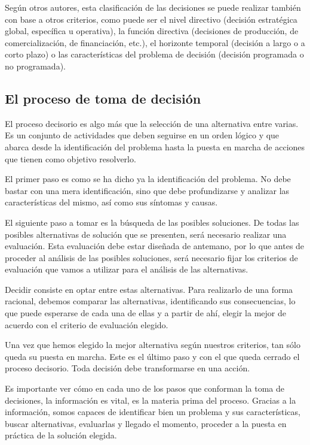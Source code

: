 \documentclass[
]{krantz}
\begin{document}
Según otros autores, esta clasificación de las decisiones se puede realizar también con base a otros criterios, como puede ser el nivel directivo (decisión estratégica global, específica u operativa), la función directiva (decisiones de producción, de comercialización, de financiación, etc.), el horizonte temporal (decisión a largo o a corto plazo) o las características del problema de decisión (decisión programada o no programada).

\hypertarget{el-proceso-de-toma-de-decisiuxf3n}{%
\subsection{El proceso de toma de decisión}\label{el-proceso-de-toma-de-decisiuxf3n}}

El proceso decisorio es algo más que la selección de una alternativa entre varias. Es un conjunto de actividades que deben seguirse en un orden lógico y que abarca desde la identificación del problema hasta la puesta en marcha de acciones que tienen como objetivo resolverlo.

El primer paso es como se ha dicho ya la identificación del problema. No debe bastar con una mera identificación, sino que debe profundizarse y analizar las características del mismo, así como sus síntomas y causas.

El siguiente paso a tomar es la búsqueda de las posibles soluciones. De todas las posibles alternativas de solución que se presenten, será necesario realizar una evaluación. Esta evaluación debe estar diseñada de antemano, por lo que antes de proceder al análisis de las posibles soluciones, será necesario fijar los criterios de evaluación que vamos a utilizar para el análisis de las alternativas.

Decidir consiste en optar entre estas alternativas. Para realizarlo de una forma racional, debemos comparar las alternativas, identificando sus consecuencias, lo que puede esperarse de cada una de ellas y a partir de ahí, elegir la mejor de acuerdo con el criterio de evaluación elegido.

Una vez que hemos elegido la mejor alternativa según nuestros criterios, tan sólo queda su puesta en marcha. Este es el último paso y con el que queda cerrado el proceso decisorio. Toda decisión debe transformarse en una acción.

Es importante ver cómo en cada uno de los pasos que conforman la toma de decisiones, la información es vital, es la materia prima del proceso. Gracias a la información, somos capaces de identificar bien un problema y sus características, buscar alternativas, evaluarlas y llegado el momento, proceder a la puesta en práctica de la solución elegida.
\end{document}
